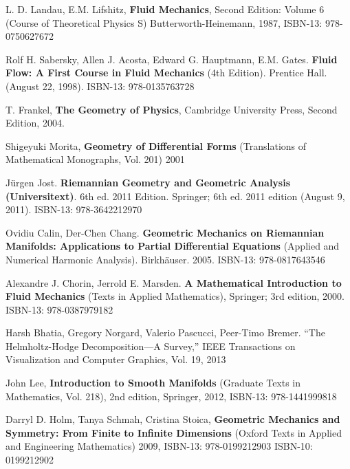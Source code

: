 \documentclass[twoside,landscape,10pt]{amsart}
\theoremstyle{plain}
\theoremstyle{definition}
\theoremstyle{remark}
\theoremstyle{remark}
\begin{document}
\begin{thebibliography}{9}

L. D. Landau, E.M. Lifshitz, \textbf{Fluid Mechanics}, Second Edition: Volume 6 (Course of Theoretical Physics S) Butterworth-Heinemann, 1987, ISBN-13: 978-0750627672

Rolf H. Sabersky, Allen J. Acosta, Edward G. Hauptmann, E.M. Gates.  \textbf{Fluid Flow: A First Course in Fluid Mechanics} (4th Edition).  Prentice Hall. (August 22, 1998).  ISBN-13: 978-0135763728

T. Frankel,
\textbf{The Geometry of Physics}, 
Cambridge University Press, 
Second Edition,
2004.

Shigeyuki Morita, \textbf{Geometry of Differential Forms} (Translations of Mathematical Monographs, Vol. 201)  2001


J\"{u}rgen Jost. \textbf{Riemannian Geometry and Geometric Analysis (Universitext)}. 6th ed. 2011 Edition.  Springer; 6th ed. 2011 edition (August 9, 2011).  ISBN-13: 978-3642212970


Ovidiu Calin, Der-Chen Chang. \textbf{Geometric Mechanics on Riemannian Manifolds: Applications to Partial Differential Equations} (Applied and Numerical Harmonic Analysis).  Birkh\"{a}user. 2005. ISBN-13: 978-0817643546







Alexandre J. Chorin, Jerrold E. Marsden. \textbf{A Mathematical Introduction to Fluid Mechanics} (Texts in Applied Mathematics), Springer; 3rd edition, 2000. ISBN-13: 978-0387979182


Harsh Bhatia, Gregory Norgard, Valerio Pascucci, Peer-Timo Bremer. ``The Helmholtz-Hodge Decomposition—A Survey,'' IEEE Transactions on Visualization and Computer Graphics, Vol. 19,  2013


John Lee, \textbf{Introduction to Smooth Manifolds} (Graduate Texts in Mathematics, Vol. 218), 2nd edition, Springer,  2012, ISBN-13: 978-1441999818


Darryl D. Holm, Tanya Schmah, Cristina Stoica, \textbf{Geometric Mechanics and Symmetry: From Finite to Infinite Dimensions} (Oxford Texts in Applied and Engineering Mathematics) 2009,  ISBN-13: 978-0199212903  ISBN-10: 0199212902  


\end{thebibliography}
\end{document}
